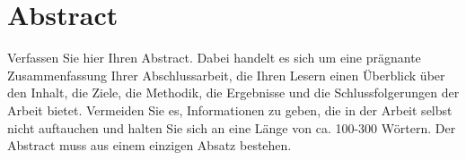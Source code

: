 \section*{Abstract}
Verfassen Sie hier Ihren Abstract. Dabei handelt es sich um eine prägnante Zusammenfassung Ihrer Abschlussarbeit, die Ihren Lesern einen Überblick über den Inhalt, die Ziele, die Methodik, die Ergebnisse und die Schlussfolgerungen der Arbeit bietet. Vermeiden Sie es, Informationen zu geben, die in der Arbeit selbst nicht auftauchen und halten Sie sich an eine Länge von ca. 100-300 Wörtern. Der Abstract muss aus einem einzigen Absatz bestehen.